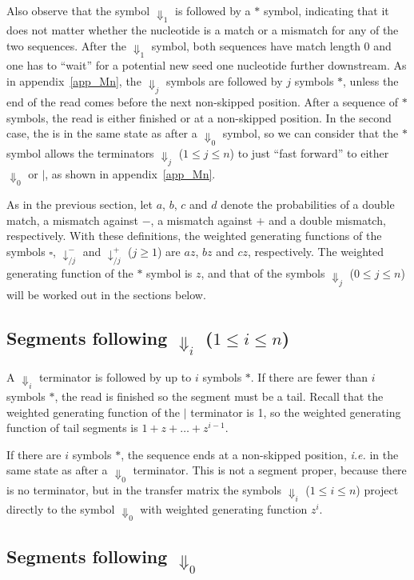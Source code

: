 \documentclass{article}
\begin{document}
Also observe that the symbol $\Downarrow_1$ is followed by a $*$ symbol,
indicating that it does not matter whether the nucleotide is a match or a
mismatch for any of the two sequences. After the $\Downarrow_1$ symbol,
both sequences have match length 0 and one has to ``wait'' for a potential
new seed one nucleotide further downstream. As in appendix~\ref{app_Mn},
the $\Downarrow_j$ symbols are followed by $j$ symbols $*$, unless the end
of the read comes before the next non-skipped position. After a sequence
of $*$ symbols, the read is either finished or at a non-skipped position.
In the second case, the is in the same state as after a $\Downarrow_0$
symbol, so we can consider that the $*$ symbol allows the terminators
$\Downarrow_j$ ($1 \leq j \leq n$) to just ``fast forward'' to either
$\Downarrow_0$ or $|$, as shown in appendix~\ref{app_Mn}.

As in the previous section, let $a$, $b$, $c$ and $d$ denote the
probabilities of a double match, a mismatch against $-$, a mismatch
against $+$ and a double mismatch, respectively. With these definitions,
the weighted generating functions of the symbols $\square$,
$\downarrow_{/j}^-$ and $\downarrow_{/j}^+$ ($j \geq 1$) are $az$, $bz$
and $cz$, respectively. The weighted generating function of the $*$ symbol
is $z$, and that of the symbols $\Downarrow_j$ ($0 \leq j \leq n$) will be
worked out in the sections below.


\subsection{Segments following $\Downarrow_i$ ($1 \leq i \leq n$)}

A $\Downarrow_i$ terminator is followed by up to $i$ symbols $*$. If there
are fewer than $i$ symbols $*$, the read is finished so the segment must
be a tail. Recall that the weighted generating function of the $|$
terminator is 1, so the weighted generating function of tail segments is
$1 + z + \ldots + z^{i-1}$.

If there are $i$ symbols $*$, the sequence ends at a non-skipped position,
\textit{i.e.} in the same state as after a $\Downarrow_0$ terminator. This
is not a segment proper, because there is no terminator, but in the
transfer matrix the symbols $\Downarrow_i$ ($1 \leq i \leq n$) project
directly to the symbol $\Downarrow_0$ with weighted generating function
$z^i$.

\subsection{Segments following $\Downarrow_0$}
\end{document}

